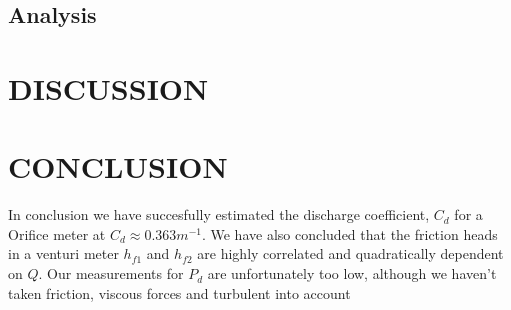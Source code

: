 \documentclass[%
 aapm,
 mph,%
 amsmath,amssymb,
 reprint,%
]{revtex4-2}
\begin{document}

\subsection{Analysis}

\newpage
\section{DISCUSSION}


\section{CONCLUSION}
In conclusion we have succesfully estimated the discharge coefficient, $C_d$ for a Orifice meter at $C_d \approx 0.363m^{-1}$. We have also concluded that the friction heads in a venturi meter $h_{f1}$ and $h_{f2}$ are highly correlated and quadratically dependent on $Q$. Our measurements for $P_d$ are unfortunately too low, although we haven't taken friction, viscous forces and turbulent into account

\end{document}

